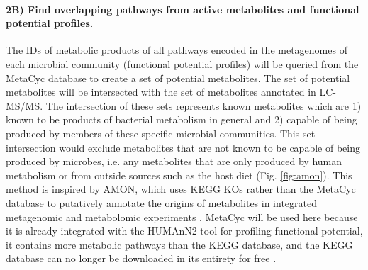 \documentclass[11pt]{article}
\begin{document}
\paragraph{2B) Find overlapping pathways from active metabolites and functional potential profiles.}

\begin{figure}
    \vspace{-8pt}
\end{figure}
The IDs of metabolic products of all pathways encoded in the metagenomes of each microbial community (functional potential profiles) will be queried from the MetaCyc database to create a set of potential metabolites.
The set of potential metabolites will be intersected with the set of metabolites annotated in LC-MS/MS.
The intersection of these sets represents known metabolites which are 1) known to be products of bacterial metabolism in general and 2) capable of being produced by members of these specific microbial communities.
This set intersection would exclude metabolites that are not known to be capable of being produced by microbes, i.e. any metabolites that are only produced by human metabolism or from outside sources such as the host diet (Fig. \ref{fig:amon}).
This method is inspired by AMON, which uses KEGG KOs rather than the MetaCyc database to putatively annotate the origins of metabolites in integrated metagenomic and metabolomic experiments \cite{shaffer_amon_2019}.
MetaCyc will be used here because it is already integrated with the HUMAnN2 tool for profiling functional potential,
it contains more metabolic pathways than the KEGG database,
and the KEGG database can no longer be downloaded in its entirety for free \cite{caspi_metacyc_2020}.
\end{document}
